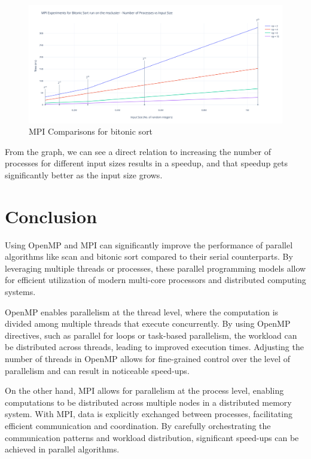 \begin{figure}[htb]
	\centering
	\includegraphics[width=0.9\linewidth]{pics/MPIGraph.png}
    	\caption{MPI Comparisons for bitonic sort}\label{fig:MPIGraph}
\end{figure}

From the graph, we can see a direct relation to increasing the number of processes for different input sizes results in a speedup, and that speedup gets significantly better as the input size grows.

\newpage

\section{Conclusion}
Using OpenMP \cite{openmp} and MPI \cite{openmpmpi} can significantly improve the performance of parallel algorithms like scan and bitonic sort compared to their serial counterparts. By leveraging multiple threads or processes, these parallel programming models allow for efficient utilization of modern multi-core processors and distributed computing systems.

OpenMP enables parallelism at the thread level, where the computation is divided among multiple threads that execute concurrently. By using OpenMP directives, such as parallel for loops or task-based parallelism, the workload can be distributed across threads, leading to improved execution times. Adjusting the number of threads in OpenMP allows for fine-grained control over the level of parallelism and can result in noticeable speed-ups.

On the other hand, MPI allows for parallelism at the process level, enabling computations to be distributed across multiple nodes in a distributed memory system. With MPI, data is explicitly exchanged between processes, facilitating efficient communication and coordination. By carefully orchestrating the communication patterns and workload distribution, significant speed-ups can be achieved in parallel algorithms.


